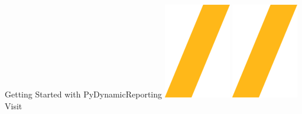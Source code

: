 \documentclass[9pt,landscape]{article}
\begin{document}
\vspace{-0.15cm}
\noindent\makebox[\linewidth]{\rule{\paperwidth}{4pt}}
\begin{center}
Getting Started with PyDynamicReporting \includegraphics[height=\fontcharht\font`\S]{slash.png} \href{https://github.com/ansys/pydynamicreporting}{\color{blue}{PyAnsys on GitHub}} \includegraphics[height=\fontcharht\font`\S]{slash.png} Visit 
\end{center}
\end{document}
